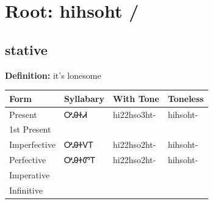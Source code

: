 \documentclass{article}%
\begin{document}
%
\normalsize%
\section*{Root: hihsoht / }%
\subsection*{stative}%
\textbf{Definition: }%
it’s lonesome%
\\[0.5em]%
\begin{tabular}{|l|l|l|l|}%
\hline%
\textbf{Form}&\textbf{Syllabary}&\textbf{With Tone}&\textbf{Toneless}\\%
\hline%
Present&ᎤᎯᏐᏗ&hi22hso3ht{-}&hihsoht{-}\\%
1st Present&&&\\%
Imperfective&ᎤᎯᏐᏙᎢ&hi22hso2ht{-}&hihsoht{-}\\%
Perfective&ᎤᎯᏐᏛᎢ&hi22hso2ht{-}&hihsoht{-}\\%
Imperative&&&\\%
Infinitive&&&\\%
\hline%
\end{tabular}%
\\[1em]%
\end{document}
